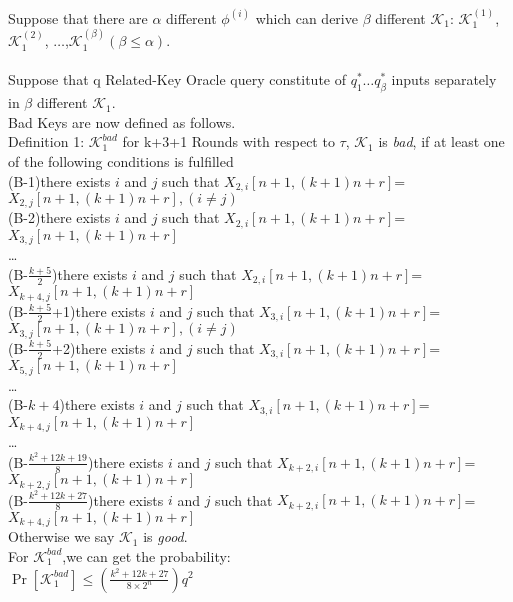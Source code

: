 Suppose that there are $\alpha$ different $\phi^{(i)}$ which can derive $\beta$ different $\mathcal{K}_{1}$: $\mathcal{K}_{1}^{(1)}$, $\mathcal{K}_{1}^{(2)}$, $\dots$,$\mathcal{K}_{1}^{(\beta)}$$(\beta\leq \alpha)$.\\\\
Suppose that q Related-Key Oracle query constitute of $q_{1}^{\ast} \dots q_{\beta}^{\ast}$ inputs separately in $\beta$ different $\mathcal{K}_{1}$.\\


Bad Keys are now defined as follows.\\
Definition 1: $\mathcal{K}_{1}^{bad}$  for k+3+1 Rounds
with respect to $\tau$, $\mathcal{K}_{1}$  is {\it bad}, if at least one of the following conditions is fulfilled\\
(B-1)there exists $i$ and $j$ such that $X_{2,i}[n+1,(k+1)n+r]$=$X_{2,j}[n+1,(k+1)n+r],(i\neq j)$\\
(B-2)there exists $i$ and $j$ such that $X_{2,i}[n+1,(k+1)n+r]$=$X_{3,j}[n+1,(k+1)n+r]$\\
\dots\\
(B-$\frac{k+5}{2}$)there exists $i$ and $j$ such that $X_{2,i}[n+1,(k+1)n+r]$=$X_{k+4,j}[n+1,(k+1)n+r]$\\
(B-$\frac{k+5}{2}$+1)there exists $i$ and $j$ such that $X_{3,i}[n+1,(k+1)n+r]$=$X_{3,j}[n+1,(k+1)n+r],(i\neq j)$\\
(B-$\frac{k+5}{2}$+2)there exists $i$ and $j$ such that $X_{3,i}[n+1,(k+1)n+r]$=$X_{5,j}[n+1,(k+1)n+r]$\\
\dots \\
(B-$k+4$)there exists $i$ and $j$ such that $X_{3,i}[n+1,(k+1)n+r]$=$X_{k+4,j}[n+1,(k+1)n+r]$\\
\dots \\
(B-$\frac{k^{2}+12k+19}{8}$)there exists $i$ and $j$ such that $X_{k+2,i}[n+1,(k+1)n+r]$=$X_{k+2,j}[n+1,(k+1)n+r]$\\
(B-$\frac{k^{2}+12k+27}{8}$)there exists $i$ and $j$ such that $X_{k+2,i}[n+1,(k+1)n+r]$=$X_{k+4,j}[n+1,(k+1)n+r]$\\

Otherwise we say $\mathcal{K}_{1}$ is {\it good}.\\
For $\mathcal{K}_{1}^{bad}$,we can get the probability:\\
$\Pr[\mathcal{K}_{1}^{bad}]\leq (\frac{k^{2}+12k+27}{8\times2^{n}})q^{2}$\\

